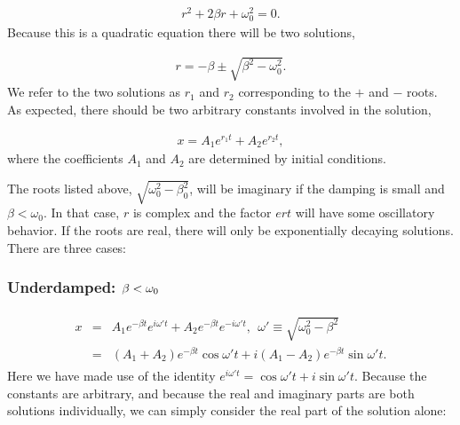 \documentclass[letterpaper,10pt,english]{sphinxmanual}
\begin{document}
\begin{equation*}
\begin{split}
\begin{equation}
r^2+2\beta r+\omega_0^2=0.
\label{_auto5} \tag{6}
\end{equation}
\end{split}
\end{equation*}
Because this is a quadratic equation there will be two solutions,




\begin{equation*}
\begin{split}
\begin{equation}
r=-\beta\pm\sqrt{\beta^2-\omega_0^2}.
\label{_auto6} \tag{7}
\end{equation}
\end{split}
\end{equation*}
We refer to the two solutions as \(r_1\) and \(r_2\) corresponding to the
\(+\) and \(-\) roots. As expected, there should be two arbitrary
constants involved in the solution,




\begin{equation*}
\begin{split}
\begin{equation}
x=A_1e^{r_1t}+A_2e^{r_2t},
\label{_auto7} \tag{8}
\end{equation}
\end{split}
\end{equation*}
where the coefficients \(A_1\) and \(A_2\) are determined by initial
conditions.

The roots listed above, \(\sqrt{\omega_0^2-\beta_0^2}\), will be
imaginary if the damping is small and \(\beta<\omega_0\). In that case,
\(r\) is complex and the factor \(e{rt}\) will have some oscillatory
behavior. If the roots are real, there will only be exponentially
decaying solutions. There are three cases:


\subsubsection{Underdamped: \protect\(\beta<\omega_0\protect\)}
\label{\detokenize{chapter4:underdamped-beta-omega-0}}\begin{equation*}
\begin{split}
\begin{eqnarray}
x&=&A_1e^{-\beta t}e^{i\omega't}+A_2e^{-\beta t}e^{-i\omega't},~~\omega'\equiv\sqrt{\omega_0^2-\beta^2}\\
\nonumber
&=&(A_1+A_2)e^{-\beta t}\cos\omega't+i(A_1-A_2)e^{-\beta t}\sin\omega't.
\end{eqnarray}
\end{split}
\end{equation*}
Here we have made use of the identity
\(e^{i\omega't}=\cos\omega't+i\sin\omega't\). Because the constants are
arbitrary, and because the real and imaginary parts are both solutions
individually, we can simply consider the real part of the solution
alone:
\end{document}

